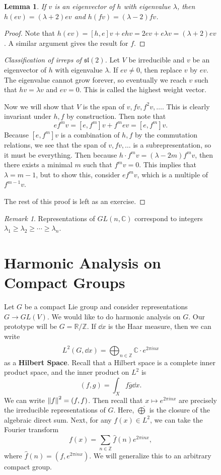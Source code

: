 \documentclass[leqno, openany]{memoir}
\newtheorem{lem}[thm]{Lemma}
\theoremstyle{definition}
\theoremstyle{remark}
\newtheorem{rmk}[thm]{Remark}
\theoremstyle{plain}
\theoremstyle{definition}
\theoremstyle{remark}
\newcommand{\R}{\mathbb{R}}
\newcommand{\C}{\mathbb{C}}
\newcommand{\Z}{\mathbb{Z}}
\newcommand{\mf}[1]{\mathfrak{#1}}
\newcommand{\ol}[1]{\overline{#1}}
\newcommand{\wh}[1]{\widehat{#1}}
\begin{document}
\begin{figure}[H]
\begin{lem} If $v$ is an eigenvector of $h$ with eigenvalue $\lambda$, then
$h(ev) = (\lambda + 2) ev$ and $h(fv) =(\lambda -2) fv$.  \end{lem}

\begin{proof} Note that $h(ev) = [h,e]v + ehv = 2ev + e \lambda v = (\lambda +
2)ev$. A similar argument gives the result for $f$.  \end{proof}

\begin{proof}[Classification of irreps of $\mf{sl}(2)$] Let $V$ be irreducible
    and $v$ be an eigenvector of $h$ with eigenvalue $\lambda$. If $ev \neq 0$,
    then replace $v$ by $ev$. The eigenvalue cannot grow forever, so eventually
    we reach $v$ such that $hv = \lambda v$ and $ev = 0$. This is called the
    highest weight vector.

    Now we will show that $V$ is the span of $v, fv, f^2 v, \ldots$. This is
    clearly invariant under $h,f$ by construction. Then note that \[ ef^m v =
    [e, f^m]v + f^m ev = [e,f^m]v. \] Because $[e,f^m]v$ is a combination of
    $h,f$ by the commutation relations, we see that the span of $v, fv, \ldots$
    is a subrepresentation, so it must be everything. Then because $h \cdot f^m
    v = (\lambda - 2m) f^m v$, then there exists a minimal $m$ such that $f^m v
    = 0$. This implies that $\lambda = m-1$, but to show this, consider $ef^m
    v$, which is a multiple of $f^{m-1}v$.

    The rest of this proof is left as an exercise.  \end{proof}

\begin{rmk} Representations of $GL(n, \C)$ correspond to integers $\lambda_1
\geq \lambda_2 \geq \cdots \geq \lambda_n$.  \end{rmk}

\section{Harmonic Analysis on Compact Groups}%

Let $G$ be a compact Lie group and consider representations $G \to GL(V)$. We
would like to do harmonic analysis on $G$. Our prototype will be $G = \R/\Z$.
If $\dd{x}$ is the Haar measure, then we can write \[ L^2(G, \dd{x}) =
\wh{\bigoplus_{n \in \Z}} \C \cdot e^{2\pi i n x} \] as a \textbf{Hilbert
Space}. Recall that a Hilbert space is a complete inner product space, and the
inner product on $L^2$ is \[ (f,g) = \int_{X} f \ol{g} \dd{x}. \] We can write
$\norm{f}^2 = (f,f)$. Then recall that $x \mapsto e^{2 \pi i n x}$ are
precisely the irreducible representations of $G$. Here, $\wh{\bigoplus}$ is the
closure of the algebraic direct sum. Next, for any $f(x) \in L^2$, we can take
the Fourier transform \[ f(x) = \sum_{n \in \Z} \wh{f}(n) e^{2 \pi i n x}, \]
where $\wh{f}(n) = (f, e^{2 \pi i n x})$. We will generalize this to an
arbitrary compact group.


\end{figure}
\end{document}
